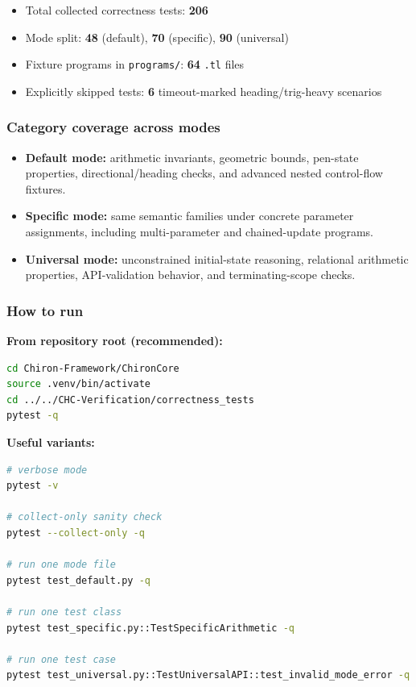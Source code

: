 \begin{itemize}[leftmargin=1.5em]
	\item Total collected correctness tests: \textbf{206}
	\item Mode split: \textbf{48} (default), \textbf{70} (specific), \textbf{90} (universal)
	\item Fixture programs in \texttt{programs/}: \textbf{64} \texttt{.tl} files
	\item Explicitly skipped tests: \textbf{6} timeout-marked heading/trig-heavy scenarios
\end{itemize}

\subsubsection*{Category coverage across modes}

\begin{itemize}[leftmargin=1.5em]
	\item \textbf{Default mode:} arithmetic invariants, geometric bounds, pen-state properties, directional/heading checks, and advanced nested control-flow fixtures.
	\item \textbf{Specific mode:} same semantic families under concrete parameter assignments, including multi-parameter and chained-update programs.
	\item \textbf{Universal mode:} unconstrained initial-state reasoning, relational arithmetic properties, API-validation behavior, and terminating-scope checks.
\end{itemize}

\subsubsection*{How to run}

\textbf{From repository root (recommended):}
\begin{lstlisting}[style=terminal, language=bash]
cd Chiron-Framework/ChironCore
source .venv/bin/activate
cd ../../CHC-Verification/correctness_tests
pytest -q
\end{lstlisting}

\textbf{Useful variants:}
\begin{lstlisting}[style=terminal, language=bash]
# verbose mode
pytest -v

# collect-only sanity check
pytest --collect-only -q

# run one mode file
pytest test_default.py -q

# run one test class
pytest test_specific.py::TestSpecificArithmetic -q

# run one test case
pytest test_universal.py::TestUniversalAPI::test_invalid_mode_error -q
\end{lstlisting}

